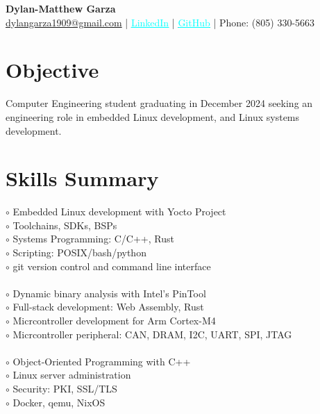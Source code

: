 \documentclass[letter,12pt]{article}
\begin{document}
\begin{center}
\textbf{\LARGE Dylan-Matthew Garza} \\[0.1cm]
\href{mailto:dylangarza1909@gmail.com}{dylangarza1909@gmail.com} |
  \href{https://www.linkedin.com/in/dylan-matthew-garza-094b021ba/}{\textcolor{cyan}{\underline{LinkedIn}}} |
  \href{https://github.com/DMGDy}{\textcolor{cyan}{\underline{GitHub}}} |
Phone: (805) 330-5663
\end{center}

\vspace{-1.5cm}
\section*{Objective}
Computer Engineering student graduating in December 2024 seeking an 
engineering role in embedded Linux development, and Linux systems 
development.

\vspace{-.5cm}
\section*{Skills Summary}
\vspace{-.5cm}
\begin{tcolorbox}
  [colback=gray!25,
  leftrule=0pt,
  rightrule=0pt,
  sharp corners]
\vspace{-.125cm}
  \begin{multicols}{3}
  $\circ$ Embedded Linux development with Yocto Project\\
  $\circ$ Toolchains, SDKs, BSPs \\
  $\circ$ Systems Programming: C/C++, Rust \\
  $\circ$ Scripting: POSIX/bash/python \\
  $\circ$ git version control and command line interface \\
  \columnbreak\\
  $\circ$ Dynamic binary analysis with Intel's PinTool\\
  $\circ$ Full-stack development: Web Assembly, Rust\\
  $\circ$ Micrcontroller development for Arm Cortex-M4\\
  $\circ$ Micrcontroller peripheral: CAN, DRAM, I2C, UART, SPI, JTAG\\
  \columnbreak\\
  $\circ$ Object-Oriented Programming with C++ \\
  $\circ$ Linux server administration \\
  $\circ$ Security: PKI, SSL/TLS\\
  $\circ$ Docker, qemu, NixOS\\
  \end{multicols}
    
\vspace{-1.00cm}
\end{tcolorbox}
\end{document}
